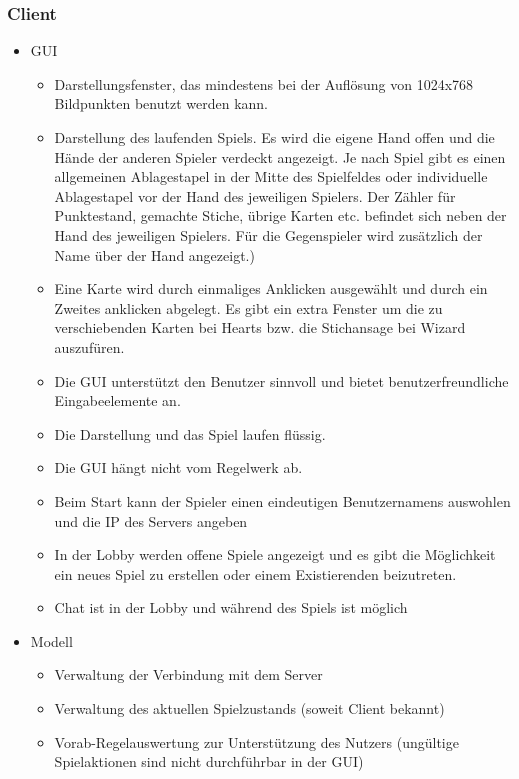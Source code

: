 \documentclass{article}
\begin{document}
\subsubsection{\gls{Client}}
\begin{itemize}
	\item GUI
	\begin{itemize}
		\item Darstellungsfenster, das mindestens bei der Auflösung von 1024x768 Bildpunkten benutzt werden kann.
		\item Darstellung des laufenden Spiels. Es wird die eigene Hand offen und die Hände der anderen Spieler verdeckt 					angezeigt. Je nach Spiel gibt es einen allgemeinen Ablagestapel in der Mitte des Spielfeldes oder individuelle 					Ablagestapel vor der Hand des jeweiligen Spielers. Der Zähler für Punktestand, gemachte Stiche, übrige Karten 					etc. befindet sich neben  der Hand des jeweiligen Spielers. Für die Gegenspieler wird zusätzlich der Name über 					der Hand angezeigt.)
		\item Eine Karte wird durch einmaliges Anklicken ausgewählt und durch ein Zweites anklicken abgelegt. Es gibt ein extra 					Fenster um die zu verschiebenden Karten bei Hearts bzw. die Stichansage bei Wizard auszufüren.
		\item Die GUI unterstützt den Benutzer sinnvoll  und bietet benutzerfreundliche Eingabeelemente an.
		\item Die Darstellung und das Spiel laufen flüssig.
		\item Die GUI hängt nicht vom \gls{Regelwerk} ab.
		\item Beim Start kann der Spieler einen eindeutigen Benutzernamens auswohlen und die IP des \gls{Server}s angeben
		\item In der \gls{Lobby} werden offene Spiele angezeigt und es gibt die Möglichkeit ein neues Spiel zu erstellen oder 					einem Existierenden beizutreten.
		\item Chat ist in der \gls{Lobby} und während des Spiels ist möglich
	\end{itemize}
	\item Modell
	\begin{itemize}
		\item Verwaltung der Verbindung mit dem \gls{Server}
		\item Verwaltung des aktuellen Spielzustands (soweit \gls{Client} bekannt)
		\item Vorab-Regelauswertung zur Unterstützung des Nutzers (ungültige Spielaktionen sind nicht durchführbar in der 					GUI)
	\end{itemize}
\end{itemize}
\end{document}
